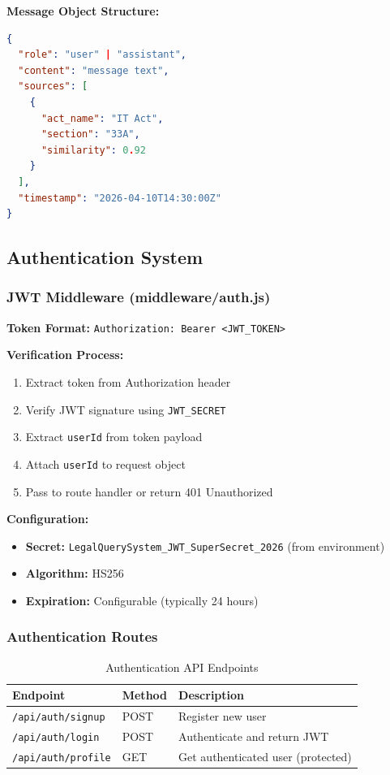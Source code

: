 \documentclass[12pt,a4paper]{article}
\begin{document}
\textbf{Message Object Structure:}
\begin{lstlisting}[language=json]
{
  "role": "user" | "assistant",
  "content": "message text",
  "sources": [
    {
      "act_name": "IT Act",
      "section": "33A",
      "similarity": 0.92
    }
  ],
  "timestamp": "2026-04-10T14:30:00Z"
}
\end{lstlisting}

\subsection{Authentication System}

\subsubsection{JWT Middleware (middleware/auth.js)}

\textbf{Token Format:} \texttt{Authorization: Bearer <JWT\_TOKEN>}

\textbf{Verification Process:}
\begin{enumerate}
    \item Extract token from Authorization header
    \item Verify JWT signature using \texttt{JWT\_SECRET}
    \item Extract \texttt{userId} from token payload
    \item Attach \texttt{userId} to request object
    \item Pass to route handler or return 401 Unauthorized
\end{enumerate}

\textbf{Configuration:}
\begin{itemize}
    \item \textbf{Secret:} \texttt{LegalQuerySystem\_JWT\_SuperSecret\_2026} (from environment)
    \item \textbf{Algorithm:} HS256
    \item \textbf{Expiration:} Configurable (typically 24 hours)
\end{itemize}

\subsubsection{Authentication Routes}

\begin{table}[H]
\centering
\caption{Authentication API Endpoints}
\label{tab:auth_routes}
\begin{tabular}{|l|l|l|}
\hline
\textbf{Endpoint} & \textbf{Method} & \textbf{Description} \\
\hline
\texttt{/api/auth/signup} & POST & Register new user \\
\hline
\texttt{/api/auth/login} & POST & Authenticate and return JWT \\
\hline
\texttt{/api/auth/profile} & GET & Get authenticated user (protected) \\
\hline
\end{tabular}
\end{table}
\end{document}
